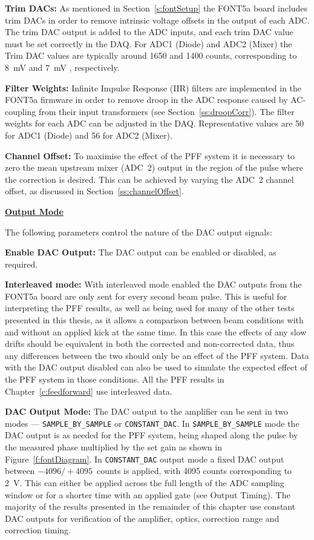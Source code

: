 \textbf{Trim DACs:} As mentioned in Section~\ref{s:fontSetup} the FONT5a board includes trim DACs in order to remove intrinsic voltage offsets in the output of each ADC. The trim DAC output is added to the ADC inputs, and each trim DAC value must be set correctly in the DAQ. For ADC1 (Diode) and ADC2 (Mixer) the Trim DAC values are typically around 1650 and 1400 counts, corresponding to 8~mV and 7~mV \cite{dougThesis}, respectively.

\textbf{Filter Weights:} Infinite Impulse Response (IIR) filters are implemented in the FONT5a firmware in order to remove droop in the ADC response caused by AC-coupling from their input transformers (see Section~\ref{ss:droopCorr}). The filter weights for each ADC can be adjusted in the DAQ. Representative values are 50 for ADC1 (Diode) and 56 for ADC2 (Mixer).

\textbf{Channel Offset:} 
To maximise the effect of the PFF system it is necessary to zero the mean upstream mixer (ADC~2) output in the region of the pulse where the correction is desired. This can be achieved by varying the ADC~2 channel offset, as discussed in Section~\ref{ss:channelOffset}.

\vspace{0.2cm}
\noindent\underline{\textbf{Output Mode}}

\noindent The following parameters control the nature of the DAC output signals:

\textbf{Enable DAC Output:} The DAC output can be enabled or disabled, as required.

\textbf{Interleaved mode:} With interleaved mode enabled the DAC outputs from the FONT5a board are only sent for every second beam pulse. This is useful for interpreting the PFF results, as well as being used for many of the other tests presented in this thesis, as it allows a comparison between beam conditions with and without an applied kick at the same time. In this case the effects of any slow drifts should be equivalent in both the corrected and non-corrected data, thus any differences between the two should only be an effect of the PFF system. Data with the DAC output disabled can also be used to simulate the expected effect of the PFF system in those conditions. All the PFF results in Chapter~\ref{c:feedforward} use interleaved data.

\textbf{DAC Output Mode:} The DAC output to the amplifier can be sent in two modes --- \texttt{SAMPLE\_BY\_SAMPLE} or \texttt{CONSTANT\_DAC}. In \texttt{SAMPLE\_BY\_SAMPLE} mode the DAC output is as needed for the PFF system, being shaped along the pulse by the measured phase multiplied by the set gain as shown in Figure~\ref{f:fontDiagram}. 
In  \texttt{CONSTANT\_DAC} output mode a fixed DAC output between  \(-4096/+4095\)~counts is applied, with 4095 counts corresponding to 2~V. This can either be applied across the full length of the ADC sampling window or for a shorter time with an applied gate (see Output Timing). 
The majority of the results presented in the remainder of this chapter use constant DAC outputs for verification of the amplifier, optics, correction range and correction timing.

